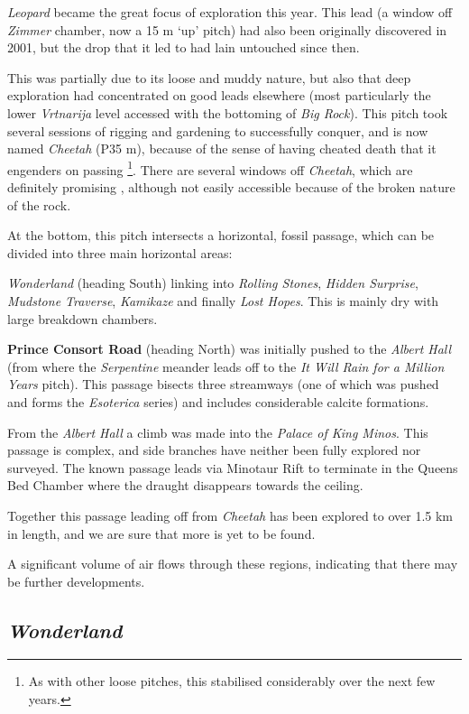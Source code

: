 \emph{Leopard} became the great focus of exploration this year. This
lead (a window off \emph{Zimmer} chamber, now a 15 m `up' pitch) had
also been originally discovered in 2001, but the drop that it led to had
lain untouched since then.

This was partially due to its loose and muddy nature, but also that deep
exploration had concentrated on good leads elsewhere (most particularly
the lower \emph{Vrtnarija} level accessed with the bottoming of
\emph{Big Rock}). This pitch took several sessions of rigging and
gardening to successfully conquer, and is now named \emph{Cheetah} (P35
m), because of the sense of having cheated death that it engenders on
passing
\footnote{As with other loose pitches, this stabilised considerably over
the next few years.}. There are several windows off \emph{Cheetah},
which are definitely promising
,
although not easily accessible because of the broken nature of the rock.

At the bottom, this pitch intersects a horizontal, fossil passage, which
can be divided into three main horizontal areas:

\emph{Wonderland} (heading South) linking into \emph{Rolling Stones},
\emph{Hidden Surprise}, \emph{Mudstone Traverse}, \emph{Kamikaze} and
finally \emph{Lost Hopes}. This is mainly dry with large breakdown
chambers.

\textbf{Prince Consort Road} (heading North) was initially pushed to the
\emph{Albert Hall} (from where the \emph{Serpentine} meander leads off
to the \emph{It Will Rain for a Million Years} pitch). This passage
bisects three streamways (one of which was pushed and forms the
\emph{Esoterica} series) and includes considerable calcite formations.

From the \emph{Albert Hall} a climb was made into the \emph{Palace of
King Minos}. This passage is complex, and side branches have neither
been fully explored nor surveyed. The known passage leads via Minotaur
Rift to terminate in the Queens Bed Chamber where the draught disappears
towards the ceiling.

Together this passage leading off from \emph{Cheetah} has been explored
to over 1.5 km in length, and we are sure that more is yet to be found.

A significant volume of air flows through these regions, indicating that
there may be further developments.

\hypertarget{wonderland}{%
\subsection{\texorpdfstring{\emph{Wonderland}}{Wonderland}}\label{wonderland}}

